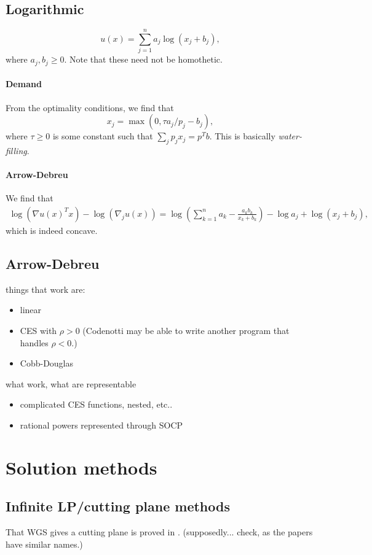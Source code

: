 \documentclass[12pt]{article}
\begin{document}
\subsection{Logarithmic}
\[
u(x) = \sum_{j=1}^n a_j \log(x_j+ b_j),
\]
where $a_j, b_j \geq 0$.  Note that these need not be homothetic.

\paragraph{Demand}
From the optimality conditions, we find that
\[
x_j = \max(0, \tau a_j/p_j - b_j),
\]
where $\tau \geq 0$ is some constant such that $\sum_j p_j x_j = p^Tb$.
This is basically \emph{water-filling}.

\paragraph{Arrow-Debreu}
We find that 
\begin{align*}
\log(\nabla u(x)^T x) - \log(\nabla_j u(x)) =
\log\left(\sum_{k=1}^n a_k - \frac{a_k b_k}{x_k+b_k} \right) - \log a_j + \log (x_j + b_j),
\end{align*}
which is indeed concave.


\subsection{Arrow-Debreu}
things that work are:
\begin{itemize}
\item linear
\item CES with $\rho > 0$ (Codenotti may be able to write another program
that handles $\rho < 0$.)
\item Cobb-Douglas
\end{itemize}
what work, what are representable
\begin{itemize}
\item complicated CES functions, nested, etc..
\item rational powers represented through SOCP
\end{itemize}

\section{Solution methods}

\subsection{Infinite LP/cutting plane methods}
That WGS gives a cutting plane is proved in \cite{arrow1959stability}.
(supposedly... check, as the papers have similar names.)
\end{document}
